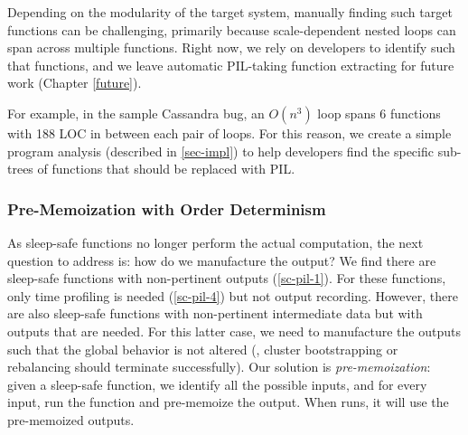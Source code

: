 Depending on the modularity of the target system, manually finding such target
functions can be challenging, primarily because scale-dependent nested loops can
span across multiple functions. Right now, we rely on developers to identify
such that functions, and we leave automatic PIL-taking function extracting for
future work (Chapter \ref{future}).

\fi

For example, in the sample Cassandra bug, an
$O(n^3)$ loop spans 6 functions with 188 LOC in between each pair of loops.  For
this reason, we create a simple program analysis \prx (described in
\sec\ref{sec-impl}) to help developers find the specific sub-trees of functions
that should be replaced with PIL.
\fi


\subsubsection{Pre-Memoization with Order Determinism}
\label{sc-pil-3}

As sleep-safe functions no longer perform the actual computation, the next
question to address is: how do we manufacture the output?  We find there
are sleep-safe functions with non-pertinent outputs
(\sec\ref{sc-pil-1}). For these functions, only time profiling is needed
(\sec\ref{sc-pil-4}) but not output recording.  However, there are also
sleep-safe functions with non-pertinent intermediate data but with outputs
that are needed.
%
For this latter case, we need to manufacture the outputs such that the
global behavior is not altered (\eg, cluster bootstrapping or rebalancing
should terminate successfully).
%
Our solution is {\em pre-memoization}: given a sleep-safe
function, we identify all the possible inputs, and for every input, run
the function and pre-memoize the output.  
When \sck runs, it will use the pre-memoized outputs.


